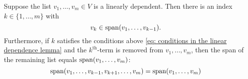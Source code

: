 


\setcounter{thm}{18}
\begin{thm} 
  \label{thm: linear dependence lemma}
  Suppose the list $v_{1}, \dots, v_{m}\in V$ is a linearly dependent. Then there is an index $k \in \{ 1, \dots, m \}$ with
  \begin{equation}
    \label{eq: conditions in the linear dependence lemma}
    v_k \in \operatorname{span} (v_1, \dots, v_{k-1}).
  \end{equation}
  Furthermore, if $k$ satisfies the conditions above \eqref{eq: conditions in the linear dependence lemma} and the $k^{\text{th}}$-term is removed from $v_1, \dots, v_m$, then the span of the remaining list equals $\operatorname{span} (v_1, \dots, v_{m})$:
  \begin{equation}
    \operatorname{span} (v_1, \dots, v_{k-1}, v_{k+1}, \dots, v_m) = \operatorname{span} (v_1, \dots, v_m)
  \end{equation}
\end{thm}


